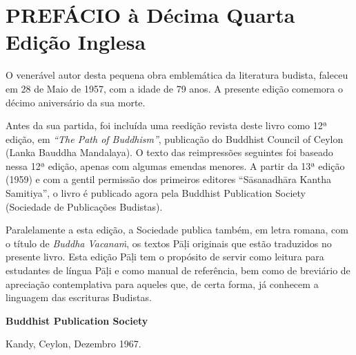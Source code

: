 \chapter{PREFÁCIO à Décima Quarta Edição Inglesa}

O venerável autor desta pequena obra emblemática da literatura budista, faleceu em 28 de Maio de 1957, com a idade de 79 anos. A presente edição comemora o décimo aniversário da sua morte.

Antes da sua partida, foi incluída uma reedição revista deste livro como 12ª edição, em \emph{``The Path of Buddhism''}, publicação do Buddhist Council of Ceylon (Lanka Bauddha Mandalaya). O texto das reimpressões seguintes foi baseado nessa 12ª edição, apenas com algumas emendas menores. A partir da 13ª edição (1959) e com a gentil permissão dos primeiros editores ``Sāsanadhāra Kantha Samitiya'', o livro é publicado agora pela Buddhist Publication Society (Sociedade de Publicações Budistas).

Paralelamente a esta edição, a Sociedade publica também, em letra romana, com o título de \emph{Buddha Vacanaṁ}, os textos Pāḷi originais que estão traduzidos no presente livro. Esta edição Pāḷi tem o propósito de servir como leitura para estudantes de língua Pāḷi e como manual de referência, bem como de breviário de apreciação contemplativa para aqueles que, de certa forma, já conhecem a linguagem das escrituras Budistas.

\textbf{Buddhist Publication Society}

Kandy, Ceylon, Dezembro 1967.
